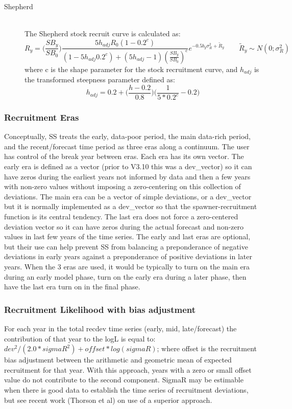 \begin{description}
	\item[Shepherd]\hfil\\
	\hypertarget{Shepard}{The} Shepherd stock recruit curve is calculated as:
	\begin{equation}
		R_y = \bigg(\frac{SB_y}{SB_0}\bigg)\frac{5h_{adj}R_0(1-0.2^c)}{(1-5h_{adj}0.2^c)+(5h_{adj}-1)(\frac{SB_y}{SB_0})^c}e^{-0.5b_y\sigma^2_R+\tilde{R}_y}\qquad \tilde{R}_y\sim N(0;\sigma^2_R)
	\end{equation}
	where c is the shape parameter for the stock recruitment curve, and $h_{adj}$ is the transformed steepness parameter defined as:
	\begin{equation}
		h_{adj}=0.2+\bigg(\frac{h-0.2}{0.8}\bigg)\bigg(\frac{1}{5*0.2^c}-0.2\bigg)
	\end{equation}
\end{description}

\subsubsection{Recruitment Eras}
Conceptually, SS treats the early, data-poor period, the main data-rich period, and the recent/forecast time period as three eras along a continuum.  The user has control of the break year between eras.  Each era has its own vector.  The early era is defined as a vector (prior to V3.10 this was a dev\_vector) so it can have zeros during the earliest years not informed by data and then a few years with non-zero values without imposing a zero-centering on this collection of deviations.  The main era can be a vector of simple deviations, or a dev\_vector but it is normally implemented as a dev\_vector so that the spawner-recruitment function is its central tendency.  The last era does not force a zero-centered deviation vector so it can have zeros during the actual forecast and non-zero values in last few years of the time series.  The early and last eras are optional, but their use can help prevent SS from balancing a preponderance of negative deviations in early years against a preponderance of positive deviations in later years.  When the 3 eras are used, it would be typically to turn on the main era during an early model phase, turn on the early era during a later phase, then have the last era turn on in the final phase.

\subsubsection{Recruitment Likelihood with bias adjustment}
For each year in the total recdev time series (early, mid, late/forecast) the contribution of that year to the logL is equal to:  $dev^2/(2.0*sigmaR^2)+offset*log(sigmaR)$; where offset is the recruitment bias adjustment between the arithmetic and geometric mean of expected recruitment for that year.  With this approach, years with a zero or small offset value do not contribute to the second component. SigmaR may be estimable when there is good data to establish the time series of recruitment deviations, but see recent work (Thorson et al) on use of a superior approach.


